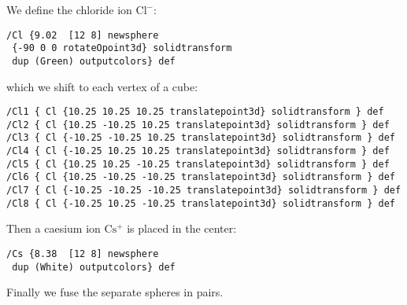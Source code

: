 We define the chloride ion $\mathrm{Cl^-}$:
\begin{verbatim}
/Cl {9.02  [12 8] newsphere
 {-90 0 0 rotateOpoint3d} solidtransform
 dup (Green) outputcolors} def
\end{verbatim}
which we shift to each vertex of a cube:
\begin{verbatim}
/Cl1 { Cl {10.25 10.25 10.25 translatepoint3d} solidtransform } def
/Cl2 { Cl {10.25 -10.25 10.25 translatepoint3d} solidtransform } def
/Cl3 { Cl {-10.25 -10.25 10.25 translatepoint3d} solidtransform } def
/Cl4 { Cl {-10.25 10.25 10.25 translatepoint3d} solidtransform } def
/Cl5 { Cl {10.25 10.25 -10.25 translatepoint3d} solidtransform } def
/Cl6 { Cl {10.25 -10.25 -10.25 translatepoint3d} solidtransform } def
/Cl7 { Cl {-10.25 -10.25 -10.25 translatepoint3d} solidtransform } def
/Cl8 { Cl {-10.25 10.25 -10.25 translatepoint3d} solidtransform } def
\end{verbatim}
Then a caesium ion $\mathrm{Cs^+}$ is placed in the center:
\begin{verbatim}
/Cs {8.38  [12 8] newsphere
 dup (White) outputcolors} def
\end{verbatim}
Finally we fuse the separate spheres in pairs.

\vfill


